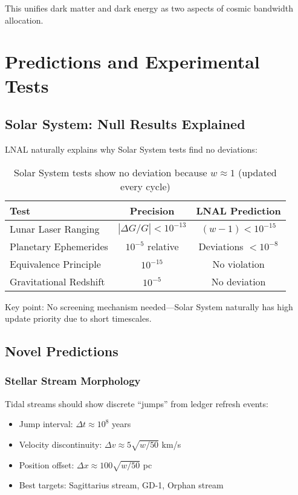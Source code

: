 \documentclass[12pt,letterpaper]{article}
\begin{document}
This unifies dark matter and dark energy as two aspects of cosmic bandwidth allocation.

\newpage

\section{Predictions and Experimental Tests}

\subsection{Solar System: Null Results Explained}

LNAL naturally explains why Solar System tests find no deviations:

\begin{table}[h]
\centering
\begin{tabular}{lcc}
\toprule
\textbf{Test} & \textbf{Precision} & \textbf{LNAL Prediction} \\
\midrule
Lunar Laser Ranging & $|\Delta G/G| < 10^{-13}$ & $(w-1) < 10^{-15}$ \\
Planetary Ephemerides & $10^{-5}$ relative & Deviations $< 10^{-8}$ \\
Equivalence Principle & $10^{-15}$ & No violation \\
Gravitational Redshift & $10^{-5}$ & No deviation \\
\bottomrule
\end{tabular}
\caption{Solar System tests show no deviation because $w \approx 1$ (updated every cycle)}
\end{table}

Key point: No screening mechanism needed—Solar System naturally has high update priority due to short timescales.

\subsection{Novel Predictions}

\subsubsection{Stellar Stream Morphology}

Tidal streams should show discrete ``jumps'' from ledger refresh events:

\begin{itemize}
    \item Jump interval: $\Delta t \approx 10^8$ years
    \item Velocity discontinuity: $\Delta v \approx 5\sqrt{w/50}$ km/s  
    \item Position offset: $\Delta x \approx 100\sqrt{w/50}$ pc
    \item Best targets: Sagittarius stream, GD-1, Orphan stream
\end{itemize}
\end{document}
